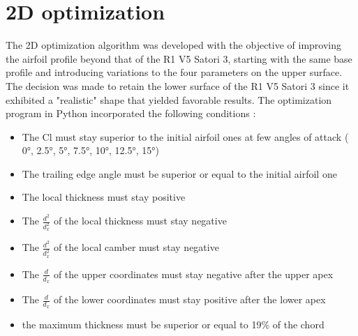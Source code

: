 


\section{2D optimization}
\label{sec:Ch2.2}

The 2D optimization algorithm was developed with the objective of improving the airfoil profile beyond that of the R1 V5 Satori 3, starting with the same base profile and introducing variations to the four parameters on the upper surface. The decision was made to retain the lower surface of the R1 V5 Satori 3 since it exhibited a "realistic" shape that yielded favorable results. The optimization program in Python incorporated the following conditions : 
\begin{itemize}
    \item The Cl must stay superior to the initial airfoil ones at few angles of attack ( 0°, 2.5°, 5°, 7.5°, 10°, 12.5°, 15°)
    \item The trailing edge angle must be superior or equal to the initial airfoil one
    \item The local thickness must stay positive
    \item The $\frac{d^{2}}{d^{2}_{x}}$ of the local thickness must stay negative
    \item The $\frac{d^{2}}{d^{2}_{x}}$ of the local camber must stay negative
    \item The $\frac{d}{d_{x}}$ of the upper coordinates must stay negative after the upper apex
    \item The $\frac{d}{d_{x}}$ of the lower coordinates must stay positive after the lower apex
    \item the maximum thickness must be superior or equal to 19\% of the chord
\end{itemize}

